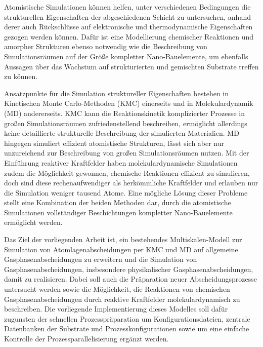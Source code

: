 
Atomistische Simulationen können helfen, unter verschiedenen Bedingungen die strukturellen Eigenschaften der abgeschiedenen Schicht zu untersuchen, anhand derer auch Rückschlüsse auf elektronische und thermodynamische Eigenschaften gezogen werden können.
Dafür ist eine Modellierung chemischer Reaktionen und amorpher Strukturen ebenso notwendig wie die Beschreibung von Simulationsräumen auf der Größe kompletter Nano-Bauelemente, um ebenfalls Aussagen über das Wachstum auf strukturierten und gemischten Substrate treffen zu können.


Ansatzpunkte für die Simulation struktureller Eigenschaften bestehen in Kinetischen Monte Carlo-Methoden (KMC) einerseits und in Molekulardynamik (MD) andererseits.
KMC kann die Reaktionskinetik komplizierter Prozesse in großen Simulationsräumen zufriedenstellend beschreiben, ermöglicht allerdings keine detaillierte strukturelle Beschreibung der simulierten Materialien.
MD hingegen simuliert effizient atomistische Strukturen, lässt sich aber nur unzureichend zur Beschreibung von großen Simulationsräumen nutzen.
Mit der Einführung reaktiver Kraftfelder haben molekulardynamische Simulationen zudem die Möglichkeit gewonnen, chemische Reaktionen effizient zu simulieren, doch sind diese rechenaufwendiger als herkömmliche Kraftfelder und erlauben nur die Simulation weniger tausend Atome.
Eine mögliche Lösung dieser Probleme stellt eine Kombination der beiden Methoden dar, durch die atomistische Simulationen vollständiger Beschichtungen kompletter Nano-Bauelemente ermöglicht werden.


Das Ziel der vorliegenden Arbeit ist, ein bestehendes Multiskalen-Modell zur Simulation von Atomlagenabscheidungen per KMC und MD auf allgemeine Gasphasenabscheidungen zu erweitern und die Simulation von Gasphasenabscheidungen, insbesondere physikalischer Gasphasenabscheidungen, damit zu realisieren.
Dabei soll auch die Präparation neuer Abscheidungsprozesse untersucht werden sowie die Möglichkeit, die Reaktionen von chemischen Gasphasenabscheidungen durch reaktive Kraftfelder molekulardynamisch zu beschreiben.
Die vorliegende Implementierung dieses Modelles soll dafür zugunsten der schnellen Prozesspräparation um Konfigurationsdateien, zentrale Datenbanken der Substrate und Prozesskonfigurationen sowie um eine einfache Kontrolle der Prozessparallelisierung ergänzt werden.

